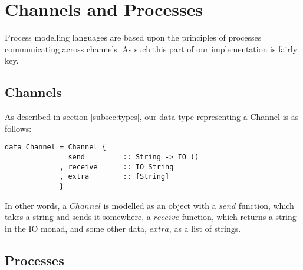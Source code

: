 \section{Channels and Processes}
\label{sec:channels}

Process modelling languages are based upon the principles of processes communicating across channels. As such this part of our implementation is fairly key. 

\subsection{Channels}

As described in section \ref{subsec:types}, our data type representing a Channel is as follows:

\begin{verbatim}
data Channel = Channel {
               send         :: String -> IO ()
             , receive      :: IO String
             , extra        :: [String]
             }
\end{verbatim}

In other words, a $Channel$ is modelled as an object with a $send$ function, which takes a string and sends it somewhere, a $receive$ function, which returns a string in the IO monad, and some other data, $extra$, as a list of strings.

\subsection{Processes}
\label{sec:processes}

